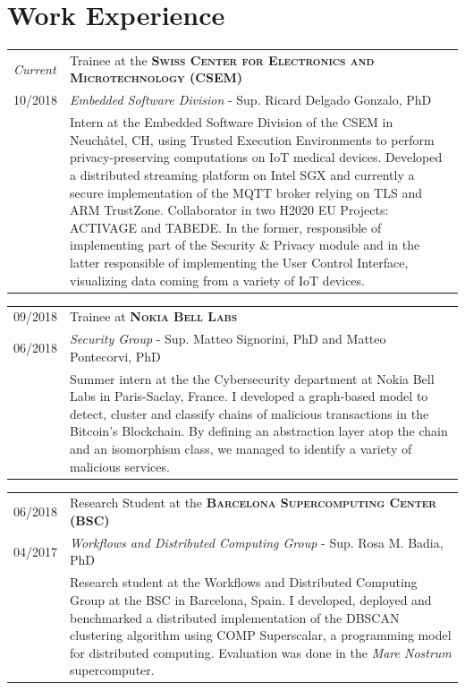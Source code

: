 \documentclass[a4paper,10pt]{article} %
\begin{document}
\section{Work Experience}
%
\begin{tabular}{R{1.5cm}|p{13.8cm}}
    \emph{Current} & Trainee at the \textbf{\textsc{Swiss Center for Electronics and Microtechnology} (CSEM)} \\
    \textsc{10/2018} & \small{\emph{Embedded Software Division} - Sup. Ricard Delgado Gonzalo, PhD }\\ 
    & \footnotesize{Intern at the Embedded Software Division of the CSEM in Neuch\^atel, CH, using Trusted Execution Environments to perform privacy-preserving computations on IoT medical devices. Developed a distributed streaming platform on Intel SGX and currently a secure implementation of the MQTT broker relying on TLS and ARM TrustZone. Collaborator in two H2020 EU Projects: ACTIVAGE and TABEDE. In the former, responsible of implementing part of the Security \& Privacy module and in the latter responsible of implementing the User Control Interface, visualizing data coming from a variety of IoT devices.}
\end{tabular}

\begin{tabular}{R{1.5cm}|p{13.8cm}}
    \textsc{09/2018} & Trainee at \textbf{\textsc{Nokia Bell Labs}} \\
    \textsc{06/2018} & \small{\emph{Security Group} - Sup. Matteo Signorini, PhD and Matteo Pontecorvi, PhD}\\ 
& \footnotesize{Summer intern at the the Cybersecurity department at Nokia Bell Labs in Paris-Saclay, France. I developed a graph-based model to detect, cluster and classify chains of malicious transactions in the Bitcoin's Blockchain. By defining an abstraction layer atop the chain and an isomorphism class, we managed to identify a variety of malicious services.}
\end{tabular}

\begin{tabular}{R{1.5cm}|p{13.8cm}}
    \textsc{06/2018} & Research Student at the \textbf{\textsc{Barcelona Supercomputing Center} (BSC)} \\
    \textsc{04/2017} & \small{\emph{Workflows and Distributed Computing Group} - Sup. Rosa M. Badia, PhD} \\ 
    & \footnotesize{Research student at the Workflows and Distributed Computing Group at the BSC in Barcelona, Spain. I developed, deployed and benchmarked a distributed implementation of the DBSCAN clustering algorithm using COMP Superscalar, a programming model for distributed computing. Evaluation was done in the \textit{Mare Nostrum} supercomputer.}
\end{tabular}
\end{document}
